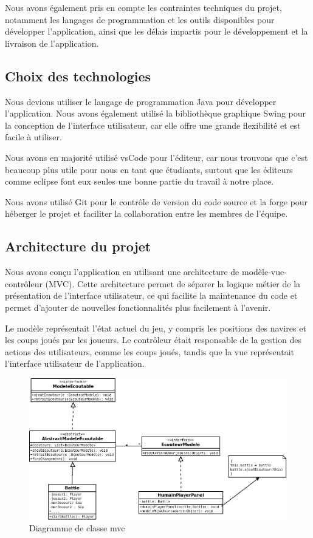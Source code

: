 \documentclass[12pt]{article}
\begin{document}
Nous avons également pris en compte les contraintes techniques du projet, notamment les langages de programmation et les outils disponibles pour développer l'application, ainsi que les délais impartis pour le développement et la livraison de l'application.

\subsection{Choix des technologies}
Nous devions utiliser le langage de programmation Java pour développer l'application. Nous avons également utilisé la bibliothèque graphique Swing pour la conception de l'interface utilisateur, car elle offre une grande flexibilité et est facile à utiliser.

Nous avons en majorité utilisé vsCode pour l'éditeur, car nous trouvons que c'est beaucoup plus utile pour nous en tant que étudiants, surtout que les éditeurs comme eclipse font eux seules une bonne partie du travail à notre place.

Nous avons utilisé Git pour le contrôle de version du code source et la forge pour héberger le projet et faciliter la collaboration entre les membres de l'équipe.

\subsection{Architecture du projet}

Nous avons conçu l'application en utilisant une architecture de modèle-vue-contrôleur (MVC). Cette architecture permet de séparer la logique métier de la présentation de l'interface utilisateur, ce qui facilite la maintenance du code et permet d'ajouter de nouvelles fonctionnalités plus facilement à l'avenir.

Le modèle représentait l'état actuel du jeu, y compris les positions des navires et les coups joués par les joueurs. Le contrôleur était responsable de la gestion des actions des utilisateurs, comme les coups joués, tandis que la vue représentait l'interface utilisateur de l'application.



\newpage
\begin{figure}[h]
\includegraphics[scale=0.5]{Diagramme1.png}
\caption{Diagramme de classe mvc}
\end{figure}
\end{document}
